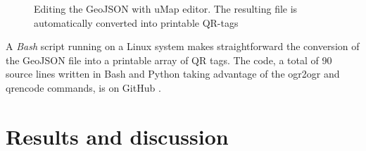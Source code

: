 \documentclass[sustainability,article,submit,pdftex,moreauthors]{Definitions/mdpi}
\begin{document}
\begin{figure}
\hfill
{}
\caption{Editing the GeoJSON with uMap editor. The resulting file is automatically converted into printable QR-tags}
\label{fig:editing}
\end{figure}

A \emph{Bash} script running on a Linux system makes straightforward the conversion of the GeoJSON file into a printable array of QR tags. The code, a total of 90 source lines written in Bash and Python taking advantage of the ogr2ogr and qrencode commands, is on GitHub .

\section{Results and discussion \label{sec:results}}
\end{document}
